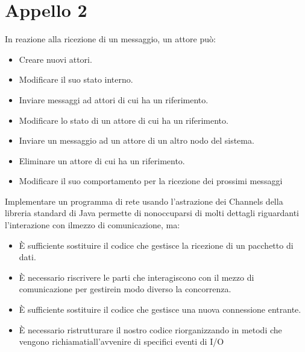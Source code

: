 \documentclass{article}
\begin{document}
\section{Appello 2}

In reazione alla ricezione di un messaggio, un attore può:

\begin{itemize}
	\item \checkmark Creare nuovi attori.
	\item \checkmark Modificare il suo stato interno.
	\item \checkmark Inviare messaggi ad attori di cui ha un riferimento.
	\item Modificare lo stato di un attore di cui ha un riferimento.
	\item Inviare un messaggio ad un attore di un altro nodo del sistema.
	\item Eliminare un attore di cui ha un riferimento.
	\item \checkmark Modificare il suo comportamento per la ricezione dei prossimi messaggi
\end{itemize}

Implementare un programma di rete usando l'astrazione dei Channels della libreria standard di Java permette di nonoccuparsi di molti dettagli riguardanti l'interazione con ilmezzo di comunicazione, ma:

\begin{itemize}
	\item È sufficiente sostituire il codice che gestisce la ricezione di un pacchetto di dati.
	\item È necessario riscrivere le parti che interagiscono con il mezzo di comunicazione per gestirein modo diverso la concorrenza.
	\item È sufficiente sostituire il codice che gestisce una nuova connessione entrante.
	\item \checkmark È necessario ristrutturare il nostro codice riorganizzando in metodi che vengono richiamatiall'avvenire di specifici eventi di I/O
\end{itemize}
\end{document}
